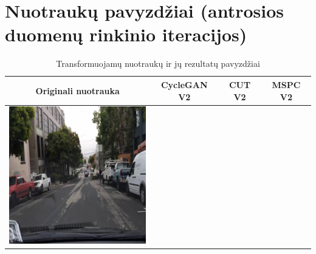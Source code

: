 \documentclass{VUMIFPSkursinis}
\begin{document}
    \section{Nuotraukų pavyzdžiai (antrosios duomenų rinkinio iteracijos)}
        \begin{table}[H]
            \footnotesize
            \centering
            \caption{Transformuojamų nuotraukų ir jų rezultatų pavyzdžiai}
            {\begin{tabular}{|c|c|c|c|} \hline
                Originali nuotrauka & CycleGAN V2  & CUT V2  & MSPC V2\\
                \hline
                \includegraphics[scale=0.35]{img/pvz/1_real} & 

\end{tabular}}
\end{table}
\end{document}
